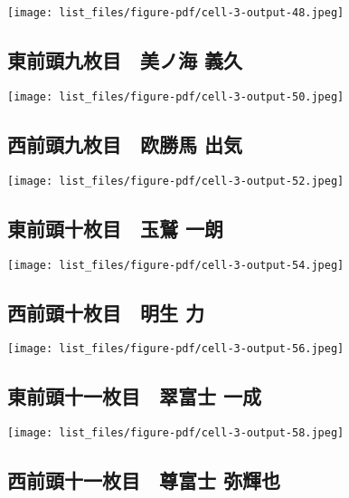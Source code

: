 \documentclass[
]{bxjsarticle}
\begin{document}
\texttt{[image: list\_files/figure-pdf/cell-3-output-48.jpeg]}

\subsection{東前頭九枚目　美ノ海
義久}\label{ux6771ux524dux982dux4e5dux679aux76ee-ux7f8eux30ceux6d77-ux7fa9ux4e45}

\texttt{[image: list\_files/figure-pdf/cell-3-output-50.jpeg]}

\subsection{西前頭九枚目　欧勝馬
出気}\label{ux897fux524dux982dux4e5dux679aux76ee-ux6b27ux52ddux99ac-ux51faux6c17}

\texttt{[image: list\_files/figure-pdf/cell-3-output-52.jpeg]}

\subsection{東前頭十枚目　玉鷲
一朗}\label{ux6771ux524dux982dux5341ux679aux76ee-ux7389ux9df2-ux4e00ux6717}

\texttt{[image: list\_files/figure-pdf/cell-3-output-54.jpeg]}

\subsection{西前頭十枚目　明生
力}\label{ux897fux524dux982dux5341ux679aux76ee-ux660eux751f-ux529b}

\texttt{[image: list\_files/figure-pdf/cell-3-output-56.jpeg]}

\subsection{東前頭十一枚目　翠富士
一成}\label{ux6771ux524dux982dux5341ux4e00ux679aux76ee-ux7fe0ux5bccux58eb-ux4e00ux6210}

\texttt{[image: list\_files/figure-pdf/cell-3-output-58.jpeg]}

\subsection{西前頭十一枚目　尊富士
弥輝也}\label{ux897fux524dux982dux5341ux4e00ux679aux76ee-ux5c0aux5bccux58eb-ux5f25ux8f1dux4e5f}
\end{document}
